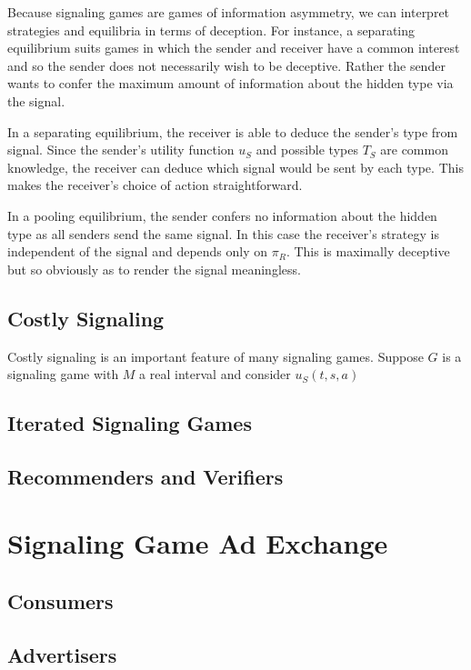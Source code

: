 \documentclass{article}
\begin{document}
Because signaling games are games of information asymmetry, we can interpret strategies and equilibria in terms of deception. For instance, a separating equilibrium suits games in which the sender and receiver have a common interest and so the sender does not necessarily wish to be deceptive. Rather the sender wants to confer the maximum amount of information about the hidden type via the signal.

In a separating equilibrium, the receiver is able to deduce the sender's type from signal. Since the sender's utility function $u_{S}$ and possible types $T_S$ are common knowledge, the receiver can deduce which signal would be sent by each type. This makes the receiver's choice of action straightforward.

In a pooling equilibrium, the sender confers no information about the hidden type as all senders send the same signal. In this case the receiver's strategy is independent of the signal and depends only on $\pi_{ R}$. This is maximally deceptive but so obviously as to render the signal meaningless.

\subsection{Costly Signaling}

Costly signaling is an important feature of many signaling games. Suppose $G$ is a signaling game with $M$ a real interval and consider $u_{S}(t,s,a)$ 

\subsection{Iterated Signaling Games}

\subsection{Recommenders and Verifiers}

\newpage

\section{Signaling Game Ad Exchange}

\subsection{Consumers}

\subsection{Advertisers}
\end{document}
